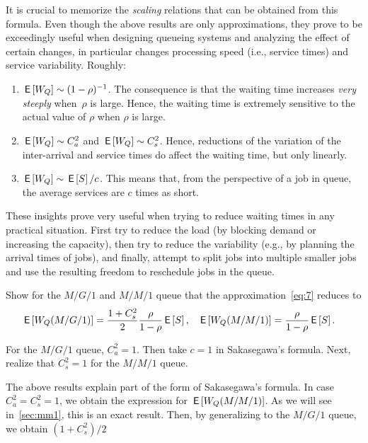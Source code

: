 It is crucial to memorize the \emph{scaling} relations that can be obtained from this formula.
Even though the above results are only approximations, they prove to be exceedingly useful when designing queueing systems and analyzing the effect of certain changes, in particular changes processing speed (i.e., service times) and service variability.
Roughly:
\begin{enumerate}
\item $\,\mathsf{E}\left[W_Q\right] \sim (1-\rho)^{-1}$. The consequence is that the waiting
 time increases \emph{very steeply} when~$\rho$ is large. Hence, the waiting time is
extremely sensitive to the actual value of $\rho$ when $\rho$ is large. 
\item $\,\mathsf{E}\left[W_Q\right] \sim C_a^2$ and $\,\mathsf{E}\left[W_Q\right] \sim C_s^2$.
 Hence, reductions of the variation of the inter-arrival and service times do affect the waiting time, but only linearly.
\item $\,\mathsf{E}\left[W_Q\right] \sim \,\mathsf{E}\left[S\right]/c$. This means that, from the perspective of a job in queue,  the average services are $c$ times as short. 
\end{enumerate}

These insights prove very useful when trying to reduce waiting times in any practical situation.
First try to reduce the load (by blocking demand or increasing the capacity), then try to reduce the variability (e.g., by planning the arrival times of jobs), and finally, attempt to split jobs into multiple smaller jobs and use the resulting freedom to reschedule jobs in the queue.




\begin{exercise}
 Show for the  $M/G/1$ and $M/M/1$ queue that  the approximation~\cref{eq:7} reduces to
\begin{align*}
  \,\mathsf{E}\left[W_Q(M/G/1)\right] &= \frac{1+C_s^2}2\frac{\rho}{1-\rho} \,\mathsf{E}\left[S\right], & 
  \,\mathsf{E}\left[W_Q(M/M/1)\right] &= \frac{\rho}{1-\rho} \,\mathsf{E}\left[S\right].
\end{align*}
\begin{solution}
For the $M/G/1$ queue, $C_a^2=1$. Then take $c=1$ in Sakasegawa's formula. Next, realize that $C_s^2=1$ for the $M/M/1$ queue. 
\end{solution}
\end{exercise}
The above results explain part of the form of Sakasegawa's formula. In case $C_a^2=C_s^2=1$, we obtain the expression for $\,\mathsf{E}\left[W_Q(M/M/1)\right]$. 
As we will see in~\cref{sec:mm1}, this is an exact result. Then, by generalizing to the $M/G/1$ queue, we obtain $(1+C_s^2)/2$

